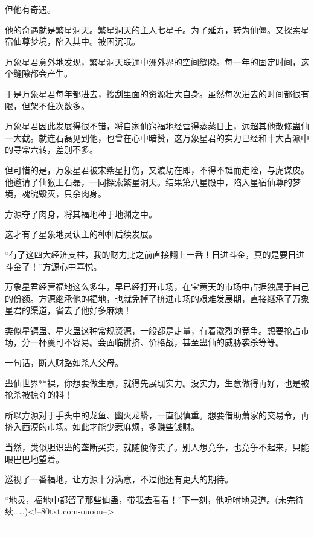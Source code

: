 \begin{this_body}
但他有奇遇。

他的奇遇就是繁星洞天。繁星洞天的主人七星子。为了延寿，转为仙僵。又探索星宿仙尊梦境，陷入其中。被困沉眠。

万象星君意外地发现，繁星洞天联通中洲外界的空间缝隙。每一年的固定时间，这个缝隙都会产生。

于是万象星君每年都进去，搜刮里面的资源壮大自身。虽然每次进去的时间都很有限，但架不住次数多。

万象星君因此发展得很不错，将自家仙窍福地经营得蒸蒸日上，远超其他散修蛊仙一大截。就连石磊见到他，也曾在心中暗赞，这万象星君的实力已经和十大古派中的寻常六转，差别不多。

但可惜的是，万象星君被宋紫星打伤，又渡劫在即，不得不铤而走险，与虎谋皮。他邀请了仙猴王石磊，一同探索繁星洞天。结果第八星殿中，陷入星宿仙尊的梦境，魂魄毁灭，只余肉身。

方源夺了肉身，将其福地种于地渊之中。

这才有了星象地灵认主的种种后续发展。

“有了这四大经济支柱，我的财力比之前直接翻上一番！日进斗金，真的是要日进斗金了！”方源心中喜悦。

万象星君经营福地这么多年，早已经打开市场，在宝黄天的市场中占据独属于自己的份额。方源继承他的福地，也就免掉了挤进市场的艰难发展期，直接继承了万象星君的渠道，省去了他好多麻烦！

类似星镖蛊、星火蛊这种常规资源，一般都是走量，有着激烈的竞争。想要抢占市场，分一杯羹可不容易。会面临排挤、价格战，甚至蛊仙的威胁袭杀等等。

一句话，断人财路如杀人父母。

蛊仙世界**裸，你想要做生意，就得先展现实力。没实力，生意做得再好，也是被抢杀被掠夺的料！

所以方源对于手头中的龙鱼、幽火龙蟒，一直很慎重。想要借助萧家的交易令，再挤入西漠的市场。如此才能少惹麻烦，多赚些钱财。

当然，类似胆识蛊的垄断买卖，就随便你卖了。别人想竞争，也竞争不起来，只能眼巴巴地望着。

巡视了一番福地，让方源十分满意，不过他还有更大的期待。

“地灵，福地中都留了那些仙蛊，带我去看看！”下一刻，他吩咐地灵道。(未完待续……)<!--80txt.com-ouoou-->

------------

\end{this_body}

